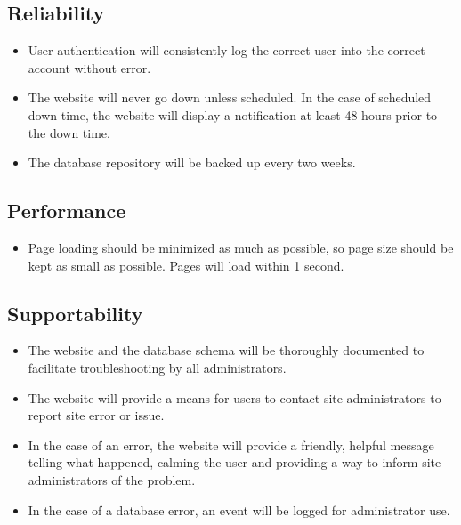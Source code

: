 	\subsection{Reliability}
	\begin{itemize}
		\item User authentication will consistently log the correct user into the correct account without error.
		\item The website will never go down unless scheduled. In the case of scheduled down time, the website will display a notification at least 48 hours prior to the down time.
		\item The database repository will be backed up every two weeks.
	\end{itemize}
	
	\subsection{Performance}
	\begin{itemize}
		\item Page loading should be minimized as much as possible, so page size should be kept as small as possible. Pages will load within 1 second.
	\end{itemize}
	
	\subsection{Supportability}
	\begin{itemize}
		\item The website and the database schema will be thoroughly documented to facilitate troubleshooting by all administrators.
		\item The website will provide a means for users to contact site administrators to report site error or issue.
		\item In the case of an error, the website will provide a friendly, helpful message telling what happened, calming the user and providing a way to inform site administrators of the problem.
		\item In the case of a database error, an event will be logged for administrator use.
	\end{itemize}